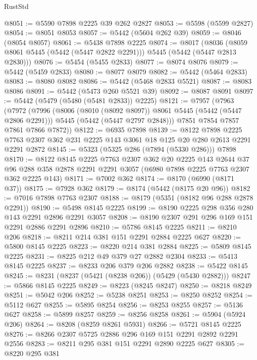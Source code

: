 \begin{lexlean}{RustStd}
\begin{coremodule}
{\begin{coremodule}
{{{{{{{{{{{{@8051 := @5590 @7898 @2225 @39 @262 @2827
@8053 := @5598 (@5599 @2827)
@8054 := @8051 @8053
@8057 := @5442 (@5604 @262 @39)
@8059 := @8046 (@8054 @8057)
@8061 := @5438 @7898 @2225
@8074 := @8017
    (@8036 (@8059 @8061 @5445 (@5442 (@5447 @2822 @2291))) @5445 (@5442 (@5447 @2813 @2830)))
@8076 := @5454 (@5455 @2833)
@8077 := @8074 @8076
@8079 := @5442 (@5459 @2833)
@8080 := @8077 @8079
@8082 := @5442 (@5464 @2833)
@8083 := @8080 @8082
@8086 := @5442 (@5468 @2833 @5521)
@8087 := @8083 @8086
@8091 := @5442 (@5473 @260 @5521 @39)
@8092 := @8087 @8091
@8097 := @5442 (@5479 (@5480 (@5481 @2833)) @2225)
@8121 := @7957
    (@7963
      (@7972
        (@7996
          (@8006 (@8010 (@8092 @8097)) @8061 @5445 (@5442 (@5447 @2806 @2291)))
          @5445
          (@5442 (@5447 @2797 @2848)))
        @7851
        @7854
        @7857
        @7861
        @7866
        @7872))
@8122 := @6935 @7898
@8139 := @8122
    @7898
    @2225
    @7763
    @2307
    @362
    @231
    @2225
    @143
    @3061
    @18
    @125
    @20
    @280
    @2613
    @2291
    @2291
    @2872
@8145 := @5323 (@5325 @286 (@7894 (@5330 @286))) @7898
@8170 := @8122
    @8145
    @2225
    @7763
    @2307
    @362
    @20
    @2225
    @143
    @2644
    @37
    @96
    @288
    @358
    @2878
    @2291
    @2291
    @3057
    (@6980 @7898 @2225 @7763 @2307 @362 @2225 @143)
@8171 := @7002 @362
@8174 := @8170 (@6990 (@8171 @37))
@8175 := @7928 @362
@8179 := @8174 (@5442 (@8175 @20 @96))
@8182 := @7016 @7898 @7763 @2307
@8188 := @8179 (@5351 (@8182 @96 @288 @2878 @2291))
@8190 := @5498 @8145 @2225
@8199 := @8190 @2225 @298 @356 @280 @143 @2291 @2896 @2291 @3057
@8208 := @8190 @2307 @291 @296 @169 @151 @2291 @2886 @2291 @2896
@8210 := @5786 @8145 @2225
@8211 := @8210 @206
@8218 := @8211 @214 @381 @151 @2291 @2884 @2225 @627
@8220 := @5800 @8145 @2225
@8223 := @8220 @214 @381 @2884
@8225 := @5809 @8145 @2225
@8231 := @8225 @212 @49 @379 @27 @2882 @2304
@8233 := @5413 @8145 @2225
@8237 := @8233 @206 @379 @206 @2882
@8238 := @5422 @8145
@8245 := @8231 (@8237 (@5421 (@8238 @206)) (@5429 (@5430 @2882)))
@8247 := @5866 @8145 @2225
@8249 := @8223 (@8245 @8247)
@8250 := @8218 @8249
@8251 := @5042 @206
@8252 := @5238 @8251
@8253 := @8250 @8252
@8254 := @5112 @627
@8255 := @5895 @8254
@8256 := @8253 @8255
@8257 := @5136 @627
@8258 := @5899 @8257
@8259 := @8256 @8258
@8261 := @5904 (@5924 @206)
@8264 := @8208 (@8259 @8261 @5931)
@8266 := @5721 @8145 @2225
@8276 := @8266 @2307 @5725 @2886 @296 @169 @151 @2291 @2892 @2291 @2556
@8283 := @8211 @295 @381 @151 @2291 @2890 @2225 @627
@8305 := @8220
    @295
    @381
}}}}}}}}}}}}
\end{coremodule}}
\end{coremodule}
\end{lexlean}
